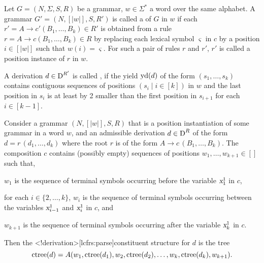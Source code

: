 \documentclass[../../document.tex]{subfiles}
\begin{document}
    \begin{definition}
        Let \(G = (N, \varSigma, S, R)\) be a grammar, \(w \in \varSigma^*\) a word over the same alphabet.
        A grammar \(G' = (N, [|w|], S, R')\) is called a  of \(G\) in \(w\) if each \(r' = A \to c' (B_1, \ldots, B_k) \in R'\) is obtained from a rule \(r = A \to c (B_1, \ldots, B_k) \in R\) by replacing each lexical symbol \(\varsigma\) in \(c\) by a position \(i \in [|w|]\) such that \(w(i) = \varsigma\).
        For such a pair of rules \(r\) and \(r'\), \(r'\) is called a position instance of \(r\) in \(w\).

        A derivation \(d \in \operatorname{D}^{R'}\) is called , if the yield \(\operatorname{yd}(d)\) of the form \((s_1, \ldots, s_k)\) contains contiguous sequences of positions \((s_i\mid i \in [k])\) in \(w\) and the last position in \(s_i\) is at least by 2 smaller than the first position in \(s_{i+1}\) for each \(i \in [k-1]\).
    \end{definition}

    \begin{definition}
        Consider a grammar \((N, [|w|], S, R)\) that is a position instantiation of some grammar in a word \(w\), and an admissible derivation \(d \in \operatorname{D}^R\) of the form \(d = r\,(d_1, \ldots, d_k)\) where the root \(r\) is of the form \(A \to c\,(B_1, \ldots, B_k)\).
        The composition \(c\) contains (possibly empty) sequences of positions \(w_1, \ldots, w_{k+1} \in []\) such that,
        \begin{compactitem}
                \item \(w_1\) is the sequence of terminal symbols occurring before the variable \(\textsl{x}_1^1\) in \(c\),
                \item for each \(i \in \{2, \ldots, k\}\), \(w_i\) is the sequence of terminal symbols occurring between the variables \(\textsl{x}_{i-1}^1\) and \(\textsl{x}_i^1\) in \(c\), and
                \item \(w_{k+1}\) is the sequence of terminal symbols occurring after the variable \(\textsl{x}_k^1\) in \(c\).
            \end{compactitem}
        Then the <\lcfrs!derivation>[lcfrs:parse]{constituent structure} for \(d\) is the tree \[
            \operatorname{ctree}(d) = A(w_1, \operatorname{ctree}(d_1), w_2, \operatorname{ctree}(d_2), \ldots, w_k, \operatorname{ctree}(d_k), w_{k+1}) \text{.}
        \]
    \end{definition}
\end{document}
